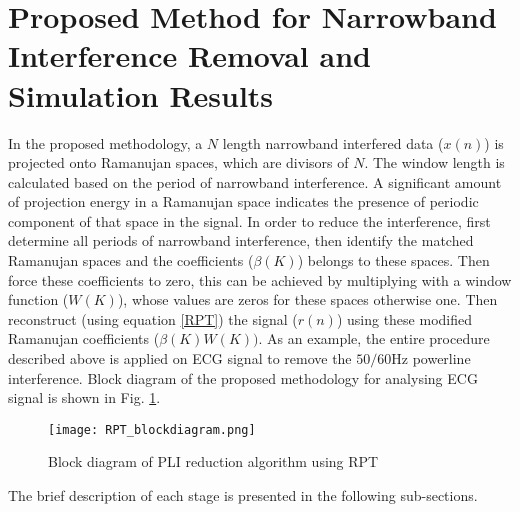 \documentclass[conference]{IEEEtran}
\begin{document}
\section{Proposed Method for Narrowband Interference Removal and Simulation Results}
In the proposed methodology, a $N$ length narrowband interfered data ($x(n)$) is projected onto Ramanujan spaces, which are divisors of $N$. The window length is calculated based on the period of narrowband interference. 
A significant amount of projection energy in a Ramanujan space indicates the presence of periodic component of that space in the signal. In order to reduce the interference, first determine all periods of narrowband interference, then identify the matched Ramanujan spaces and the coefficients ($\beta(K)$) belongs to these spaces. Then force these coefficients to zero, this can be achieved by multiplying with a window function ($W(K)$), whose values are zeros for these spaces otherwise one. Then reconstruct (using equation \eqref{RPT}) the signal ($r(n)$) using these modified Ramanujan coefficients (${\beta(K)}{W(K))}$. As an example, the entire procedure described above is applied on ECG signal to remove the $50/60$Hz powerline interference. Block diagram of the proposed methodology for analysing ECG signal is shown in Fig. \ref{f1}. 
\begin{figure}[!h]
\centering
 \texttt{[image: RPT\_blockdiagram.png]} 
\caption[Block diagram of PLI reduction algorithm using RPT]{Block diagram of PLI reduction algorithm using RPT}
\label{f1}
\end{figure}

The brief description of each stage is presented  in the following sub-sections.
\end{document}
